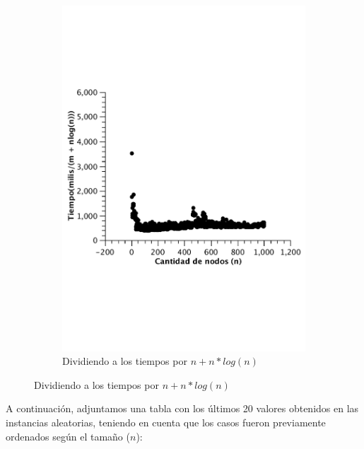 \begin{figure}[H]
        \begin{subfigure}[b]{0.5\textwidth}
                \includegraphics[width=\textwidth]{imagenes/completo-listas-4.pdf}
                \caption{Dividiendo a los tiempos por $n + n*log(n)$}
        \end{subfigure}

\end{figure}

A continuación, adjuntamos una tabla con los últimos 20 valores obtenidos en las instancias aleatorias, teniendo en cuenta que los casos fueron previamente ordenados según el tamaño ($n$):

